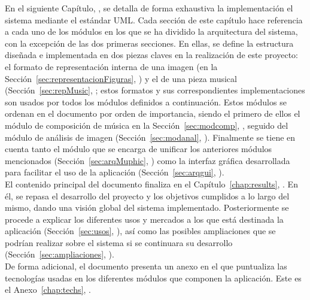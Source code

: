En el siguiente Capítulo, \textit{}, se detalla de forma exhaustiva la implementación el sistema mediante el estándar UML. Cada sección de este capítulo hace referencia a cada uno de los módulos en los que se ha dividido la arquitectura del sistema, con la excepción de las dos primeras secciones. En ellas, se define la estructura diseñada e implementada en dos piezas claves en la realización de este proyecto: el formato de representación interna de una imagen (en la Sección~\ref{sec:representacionFiguras}, \textit{}) y el de una pieza musical (Sección~\ref{sec:repMusic}, \textit{}; estos formatos y sus correspondientes implementaciones son usados por todos los módulos definidos a continuación. Estos módulos se ordenan en el documento por orden de importancia, siendo el primero de ellos el módulo de composición de música en la Sección~\ref{sec:modcomp}, \textit{}, seguido del módulo de análisis de imagen (Sección~\ref{sec:modanal}, \textit{}). Finalmente se tiene en cuenta tanto el módulo que se encarga de unificar los anteriores módulos mencionados (Sección~\ref{sec:arqMuphic}, \textit{}) como la interfaz gráfica desarrollada para facilitar el uso de la aplicación (Sección~\ref{sec:arqgui}, \textit{}).\\

El contenido principal del documento finaliza en el Capítulo~\ref{chap:results}, \textit{}. En él, se repasa el desarrollo del proyecto y los objetivos cumplidos a lo largo del mismo, dando una visión global del sistema implementado. Posteriormente se procede a explicar los diferentes usos y mercados a los que está destinada la aplicación (Sección~\ref{sec:usos}, \textit{}), así como las posibles ampliaciones que se podrían realizar sobre el sistema si se continuara su desarrollo (Sección~\ref{sec:ampliaciones}, \textit{}).\\

De forma adicional, el documento presenta un anexo en el que puntualiza las tecnologías usadas en los diferentes módulos que componen la aplicación. Este es el Anexo~\ref{chap:techs}, \textit{}.



